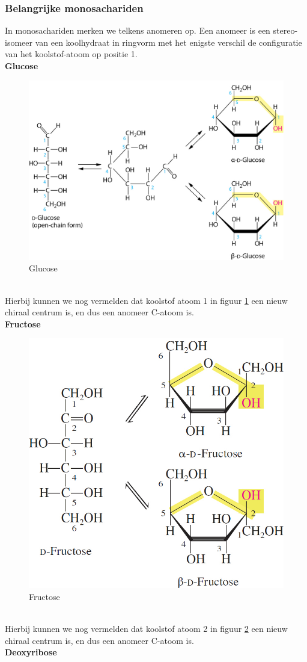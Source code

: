 \documentclass[a4paper,kul]{kulakarticle} %
\begin{document}
\subsubsection{Belangrijke monosachariden}
In monosachariden merken we telkens anomeren op. Een anomeer is een stereo-isomeer van een koolhydraat in ringvorm met het enigste verschil de configuratie van het koolstof-atoom op positie 1. \\
\textbf{Glucose}
\begin{figure}[h]
	\centering
	\includegraphics[width=0.7\linewidth]{GlucoseAlphaBeta}
	\caption[Glucose]{Glucose}
	\label{fig:glucosealphabeta}
\end{figure}\\
Hierbij kunnen we nog vermelden dat koolstof atoom 1 in figuur \ref{fig:glucosealphabeta} een nieuw chiraal centrum is, en dus een anomeer C-atoom is.\\
\textbf{Fructose}
\begin{figure}[h]
	\centering
	\includegraphics[width=0.4\linewidth]{FructoseAlphaBeta}
	\caption[Fructose]{Fructose}
	\label{fig:fructosealphabeta}
\end{figure}\\
Hierbij kunnen we nog vermelden dat koolstof atoom 2 in figuur \ref{fig:fructosealphabeta} een nieuw chiraal centrum is, en dus een anomeer C-atoom is.\\
\newpage
\textbf{Deoxyribose}
\end{document}
